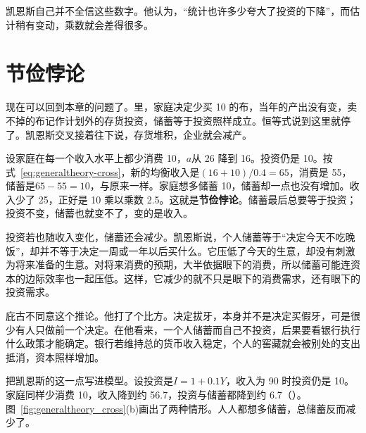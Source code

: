 凯恩斯自己并不全信这些数字。他认为，“统计也许多少夸大了投资的下降”，而估计稍有变动，乘数就会差得很多\cite{keynes1936}。

\section{节俭悖论}\label{sec:generaltheory-thrift}

现在可以回到本章的问题了。里，家庭决定少买 10 的布，当年的产出没有变，卖不掉的布记作计划外的存货投资，储蓄等于投资照样成立。恒等式说到这里就停了。凯恩斯交叉接着往下说，存货堆积，企业就会减产。

设家庭在每一个收入水平上都少消费 10，$a$从 26 降到 16。投资仍是 10。按式~\eqref{eq:generaltheory-cross}，新的均衡收入是$(16+10)/0.4=65$，消费是 55，储蓄是$65-55=10$，与原来一样。家庭想多储蓄 10，储蓄却一点也没有增加。收入少了 25，正好是 10 乘以乘数 2.5。这就是\textbf{节俭悖论}。储蓄最后总要等于投资；投资不变，储蓄也就变不了，变的是收入。

投资若也随收入变化，储蓄还会减少。凯恩斯说，个人储蓄等于“决定今天不吃晚饭”，却并不等于决定一周或一年以后买什么\cite{keynes1936}。它压低了今天的生意，却没有刺激为将来准备的生意。对将来消费的预期，大半依据眼下的消费，所以储蓄可能连资本的边际效率也一起压低\cite{keynes1936}。这样，它减少的就不只是眼下的消费需求，还有眼下的投资需求\cite{keynes1936}。

庇古不同意这个推论。他打了个比方。决定拔牙，本身并不是决定买假牙，可是很少有人只做前一个决定\cite{pigou1936}。在他看来，一个人储蓄而自己不投资，后果要看银行执行什么政策才能确定\cite{pigou1936}。银行若维持总的货币收入稳定，个人的窖藏就会被别处的支出抵消，资本照样增加\cite{pigou1936}。

把凯恩斯的这一点写进模型。设投资是$I=1+0.1Y$，收入为 90 时投资仍是 10。家庭同样少消费 10，收入降到约 56.7，投资与储蓄都降到约 6.7（）。图~\ref{fig:generaltheory_cross}(b)画出了两种情形。人人都想多储蓄，总储蓄反而减少了。


